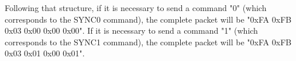 \documentclass[../monografia.tex]{subfiles}
\begin{document}
Following that structure, if it is necessary to send a command "0" (which corresponds to the SYNC0 command), the complete packet will be "0xFA 0xFB 0x03 0x00 0x00 0x00". If it is necessary to send a command "1" (which corresponds to the SYNC1 command), the complete packet will be "0xFA 0xFB 0x03 0x01 0x00 0x01".
\end{document}
